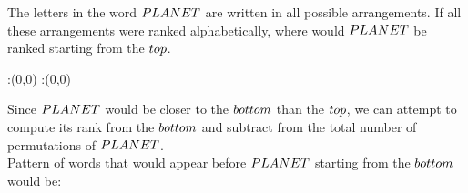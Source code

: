 \question[3] The letters in the word $PLANET$ are written in all possible 
arrangements. If all these arrangements were ranked alphabetically, where
would $PLANET$ be ranked starting from the $top$.


\watchout

\ifprintanswers
  \begin{marginfigure}
      :(0,0)
      :(0,0)
    \figdrawbegin{}
      \figdrawline [100,101]
    \figdrawend
    \figvisu{\figBoxA}{}{%
    }
    \centerline{\box\figBoxA}
  \end{marginfigure}
\fi 

\begin{solution}[\halfpage]
  Since $PLANET$ would be closer to the $bottom$ than the $top$, 
  we can attempt to compute its rank from the $bottom$ and subtract 
  from the total number of permutations of $PLANET$. \\
  Pattern of words that would appear before $PLANET$ starting from the
  $bottom$
  would be:
  

\end{solution}
